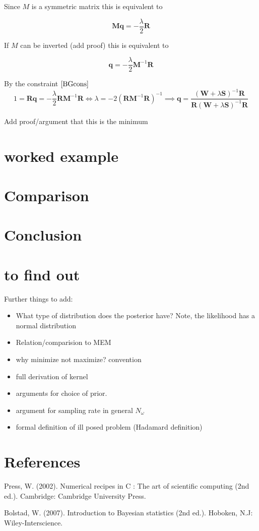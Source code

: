 \documentclass[a4paper, oneside, 12pt]{book}
\begin{document}
Since $M$ is a symmetric matrix this is equivalent to

\begin{equation}
\textbf{Mq}=-\frac{\lambda}{2}\textbf{R}
\end{equation}

If $M$ can be inverted (add proof) this is equivalent to

\begin{equation}
\textbf{q}=-\frac{\lambda}{2}\textbf{M}^{-1}\textbf{R}
\end{equation}

By the constraint $\ref{BGcons}$
\begin{equation*}
1=\textbf{Rq}=-\frac{\lambda}{2}\textbf{R}\textbf{M}^{-1}\textbf{R}
\iff
\lambda = -2(\textbf{R}\textbf{M}^{-1}\textbf{R})^{-1}
\implies \textbf{q}=\frac{(\textbf{W}+\lambda \textbf{S})^{-1}\textbf{R}}{\textbf{R}(\textbf{W}+\lambda \textbf{S})^{-1}\textbf{R}}
\end{equation*}

Add proof/argument that this is the minimum

\chapter{worked example}

\chapter{Comparison}


\chapter{Conclusion}


\chapter{to find out}

Further things to add:
\begin{itemize}  
\item What type of distribution does the posterior have? Note, the likelihood has a normal distribution
\item Relation/comparision to MEM
\item why minimize not maximize? convention
\item full derivation of kernel
\item arguments for choice of prior.
\item argument for sampling rate in general $N_{\omega}$
\item formal definition of ill posed problem (Hadamard definition)

\end{itemize}

\chapter{References}
Press, W. (2002). Numerical recipes in C : The art of scientific computing (2nd ed.). Cambridge: Cambridge University Press.

Bolstad, W. (2007). Introduction to Bayesian statistics (2nd ed.). Hoboken, N.J: Wiley-Interscience.
\end{document}
